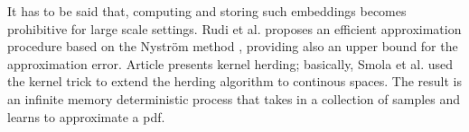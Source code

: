 It has to be said that, computing and storing such embeddings becomes prohibitive for large scale settings. Rudi et al. \cite{2022nystrom} proposes an efficient approximation procedure based on the Nyström method \cite{nystrom}, providing also an upper bound for the approximation error.
Article \cite{supersamples} presents kernel herding; basically, Smola et al. used the kernel trick to extend the herding algorithm to continous spaces. The result is an infinite memory deterministic process that takes in a collection of samples and learns to approximate a pdf.
\\
